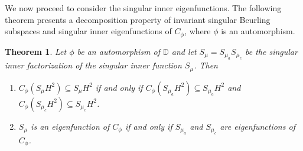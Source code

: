 \documentclass[12pt, reqno]{amsart}
\newtheorem{theorem}{Theorem}[section]
\theoremstyle{definition}
\numberwithin{equation}{section}
\begin{document}
We now proceed to consider the singular inner eigenfunctions. 
The following theorem presents a decomposition property of invariant singular Beurling subspaces and  singular inner eigenfunctions of $C_\phi$, where $\phi$ is an automorphism.
\begin{theorem}\label{splitting}
Let $\phi$ be an automorphism of $\mathbb{D}$ and let $S_\mu= S_{\mu_a}S_{\mu_c}$ be the singular inner factorization of the singular inner function $S_\mu$. Then
\begin{enumerate}
	\item $C_\phi(S_\mu H^2)\subseteq S_\mu H^2$ if and only if  $C_\phi(S_{\mu_a} H^2)\subseteq S_{\mu_a }H^2$ and $C_\phi(S_{\mu_c} H^2)\subseteq S_{\mu_c }H^2$.
	\item $S_\mu$ is an eigenfunction of $C_\phi$ if and only if $S_{\mu_a}$ and $S_{\mu_c}$ are eigenfunctions of $C_\phi$.
\end{enumerate}
\end{theorem}
\end{document}
